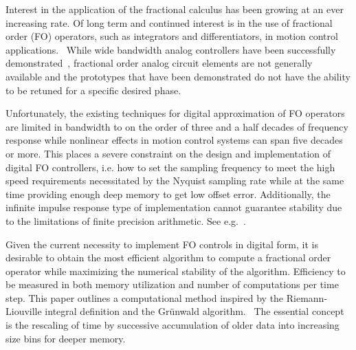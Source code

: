 
Interest in the application of the fractional calculus has been
growing at an ever increasing rate. Of long term and continued
interest is in the use of fractional order (FO) operators, such as
integrators and differentiators, in motion control
applications.~\cite{Luo:13} While wide bandwidth analog controllers
have been successfully demonstrated~\cite{Bohannan:08}, fractional
order analog circuit elements are not generally available and the
prototypes that have been demonstrated do not have the ability to be
retuned for a specific desired phase.~\cite{Monje:10}

Unfortunately, the existing techniques for digital approximation of FO
operators are limited in bandwidth to on the order of three and a half
decades of frequency response while nonlinear effects in motion
control systems can span five decades or more. This places a severe
constraint on the design and implementation of digital FO controllers,
i.e. how to set the sampling frequency to meet the high speed
requirements necessitated by the Nyquist sampling rate while at the
same time providing enough deep memory to get low offset
error. Additionally, the infinite impulse response type of
implementation cannot guarantee stability due to the limitations of
finite precision arithmetic. See e.g.~\cite{Chen:04a}.

Given the current necessity to implement FO controls in digital form,
it is desirable to obtain the most efficient algorithm to compute a
fractional order operator while maximizing the numerical stability of
the algorithm. Efficiency to be measured in both memory utilization
and number of computations per time step. This paper outlines a
computational method inspired by the Riemann-Liouville integral
definition and the Gr{\"u}nwald algorithm.~\cite{OldSpan:74} The
essential concept is the rescaling of time by successive accumulation
of older data into increasing size bins for deeper memory.

